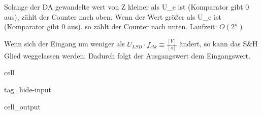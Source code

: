 \documentclass[letterpaper,10pt,english]{jupyterBook}
\begin{document}
\sphinxAtStartPar
Solange der DA gewandelte wert von Z kleiner als U\_e ist (Komparator gibt \(0\) aus),
zählt der Counter nach oben.
Wenn der Wert größer als U\_e ist (Komparator gibt \(0\) aus).
so zählt der Counter nach unten.
Laufzeit: \(O(2^n)\)

\sphinxAtStartPar
Wenn sich der Eingang um weniger als \(U_{LSB}\cdot f_{clk} \equiv \frac{[V]}{[s]}\) ändert,
so kann das S\&H Glied weggelassen werden.
Dadurch folgt der Ausgangswert dem Eingangswert.

\begin{DUlineblock}{0em}
\item[] 
\end{DUlineblock}

\begin{sphinxuseclass}{cell}
\begin{sphinxuseclass}{tag_hide-input}\begin{sphinxVerbatimOutput}

\begin{sphinxuseclass}{cell_output}
\begin{sphinxVerbatim}
\end{sphinxVerbatim}

\noindent{}

\end{sphinxuseclass}\end{sphinxVerbatimOutput}

\end{sphinxuseclass}
\end{sphinxuseclass}
\begin{DUlineblock}{0em}
\item[] 
\end{DUlineblock}

\begin{DUlineblock}{0em}
\item[] 
\end{DUlineblock}
\end{document}
